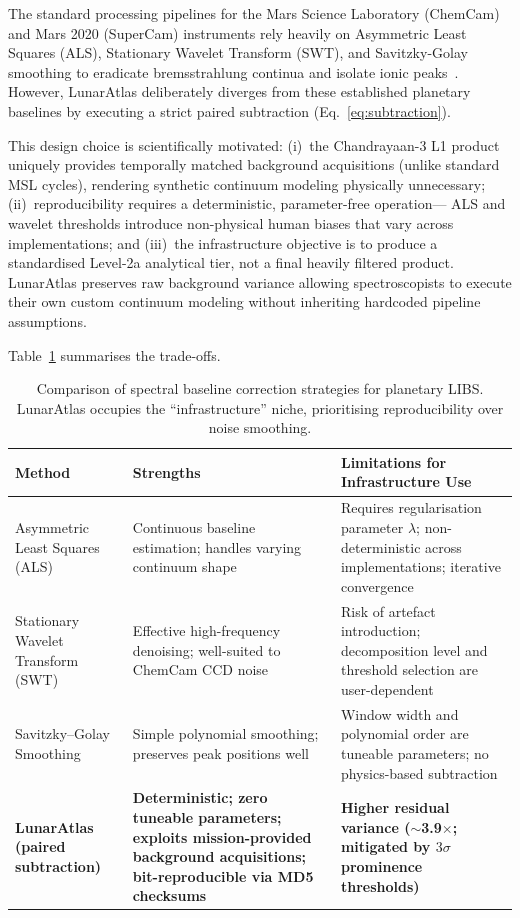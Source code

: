 \documentclass[a4paper,twocolumn,10pt]{article}
\begin{document}
The standard processing pipelines for the Mars Science Laboratory (ChemCam) and 
Mars 2020 (SuperCam) instruments rely heavily on Asymmetric Least Squares (ALS), 
Stationary Wavelet Transform (SWT), and Savitzky-Golay smoothing to eradicate 
bremsstrahlung continua and isolate ionic peaks~\cite{Clegg2017,Anderson2022,Sridhar2025}. 
However, LunarAtlas deliberately diverges from these established planetary baselines
by executing a strict paired subtraction (Eq.~\ref{eq:subtraction}).

This design choice is scientifically motivated:
(i)~the Chandrayaan-3 L1 product uniquely provides temporally matched background
acquisitions (unlike standard MSL cycles), rendering synthetic continuum modeling physically unnecessary;
(ii)~reproducibility requires a deterministic, parameter-free operation---
ALS and wavelet thresholds introduce non-physical human biases that vary across
implementations; and (iii)~the infrastructure objective is to produce a
standardised Level-2a analytical tier, not a final heavily filtered product. 
LunarAtlas preserves raw background variance allowing spectroscopists to execute
their own custom continuum modeling without inheriting hardcoded pipeline assumptions.

Table~\ref{tab:method_comp} summarises the trade-offs.

\begin{table}[!t]
\centering
\caption{Comparison of spectral baseline correction strategies for
  planetary LIBS.  LunarAtlas occupies the ``infrastructure'' niche,
  prioritising reproducibility over noise smoothing.}
\label{tab:method_comp}
\begin{tabularx}{\textwidth}{l X X}
\toprule
\textbf{Method} & \textbf{Strengths} & \textbf{Limitations for Infrastructure Use} \\
\midrule
Asymmetric Least Squares (ALS)~\cite{Clegg2017} & Continuous baseline estimation;
  handles varying continuum shape & Requires regularisation parameter
  $\lambda$; non-deterministic across implementations; iterative convergence \\
\addlinespace
Stationary Wavelet Transform (SWT)~\cite{Anderson2022} & Effective high-frequency
  denoising; well-suited to ChemCam CCD noise & Risk of artefact introduction;
  decomposition level and threshold selection are user-dependent \\
\addlinespace
Savitzky--Golay Smoothing~\cite{Sridhar2025} & Simple polynomial smoothing;
  preserves peak positions well & Window width and polynomial order
  are tuneable parameters; no physics-based subtraction \\
\addlinespace
\textbf{LunarAtlas (paired subtraction)} & \textbf{Deterministic;
  zero tuneable parameters; exploits mission-provided background
  acquisitions; bit-reproducible via MD5 checksums} & \textbf{Higher residual
  variance ($\sim$3.9$\times$; mitigated by $3\sigma$ prominence thresholds)} \\
\bottomrule
\end{tabularx}
\end{table}
\end{document}
